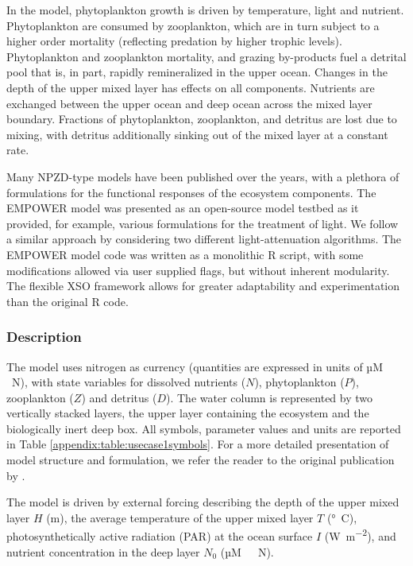 \documentclass[journal abbreviation, manuscript]{copernicus}
\begin{document}
In the model, phytoplankton growth is driven by temperature, light and nutrient. Phytoplankton are consumed by zooplankton, which are in turn subject to a higher order mortality (reflecting predation by higher trophic levels). Phytoplankton and zooplankton mortality, and grazing by-products fuel a detrital pool that is, in part, rapidly remineralized in the upper ocean. Changes in the depth of the upper mixed layer has effects on all components. Nutrients are exchanged between the upper ocean and deep ocean across the mixed layer boundary. Fractions of phytoplankton, zooplankton, and detritus are lost due to mixing, with detritus additionally sinking out of the mixed layer at a constant rate.

Many NPZD-type models have been published over the years, with a plethora of formulations for the functional responses of the ecosystem components. The EMPOWER model was presented as an open-source model testbed as it provided, for example,  various formulations for the treatment of light. We follow a similar approach by considering two different light-attenuation algorithms. The EMPOWER model code was written as a monolithic R script, with some modifications allowed via user supplied flags, but without inherent modularity. The flexible XSO framework allows for greater adaptability and experimentation than the original R code.

\subsubsection{Description}
The model uses nitrogen as currency (quantities are expressed in units of \unit{µM\,N}), with state variables for dissolved nutrients ($N$), phytoplankton ($P$), zooplankton ($Z$) and detritus ($D$). The water column is represented by two vertically stacked layers, the upper layer containing the ecosystem and the biologically inert deep box. All symbols, parameter values and units are reported in Table \ref{appendix:table:usecase1symbols}. For a more detailed presentation of model structure and formulation, we refer the reader to the original publication by \citet{Anderson2015c}.

The model is driven by external forcing describing the depth of the upper mixed layer $H$ (\unit{m}), the average temperature of the upper mixed layer $T$ (\unit{\degree C}), photosynthetically active radiation (PAR) at the ocean surface $I$ (\unit{W m^{-2}}), and nutrient concentration in the deep layer $N_0$ (\unit{µM \ N}). 
\end{document}
